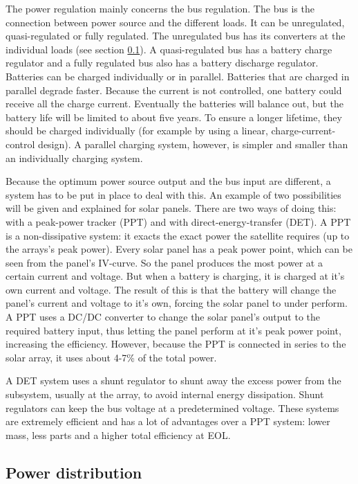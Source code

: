 The power regulation mainly concerns the bus regulation. The bus is the connection between power source and the different loads. It can be unregulated, quasi-regulated or fully regulated. The unregulated bus has its converters at the individual loads (see section \ref{blDOdistribution}).
A quasi-regulated bus has a battery charge regulator and a fully regulated bus also has a battery discharge regulator.
Batteries can be charged individually or in parallel. Batteries that are charged in parallel degrade faster. Because the current is not controlled, one battery could receive all the charge current. Eventually the batteries will balance out, but the battery life will be limited to about five years. To ensure a longer lifetime, they should be charged individually (for example by using a linear, charge-current-control design). A parallel charging system, however, is simpler and smaller than an individually charging system.

Because the optimum power source output and the bus input are different, a system has to be put in place to deal with this. An example of two possibilities will be given and explained for solar panels.
There are two ways of doing this: with a peak-power tracker (PPT) and with direct-energy-transfer (DET). 
A PPT is a non-dissipative system: it exacts the exact power the satellite requires (up to the arrays's peak power). Every solar panel has a peak power point, which can be seen from the panel's IV-curve. So the panel produces the most power at a certain current and voltage. But when a battery is charging, it is charged at it's own current and voltage. The result of this is that the battery will change the panel's current and voltage to it's own, forcing the solar panel to under perform. A PPT uses a DC/DC converter to change the solar panel's output to the required battery input, thus letting the panel perform at it's peak power point, increasing the efficiency. However, because the PPT is connected in series to the solar array, it uses about 4-7\% of the total power.

A DET system uses a shunt regulator to shunt away the excess power from the subsystem, usually at the array, to avoid internal energy dissipation. Shunt regulators can keep the bus voltage at a predetermined voltage. These systems are extremely efficient and has a lot of advantages over a PPT system: lower mass, less parts and a higher total efficiency at EOL.

\subsection{Power distribution}
\label{blDOdistribution}

